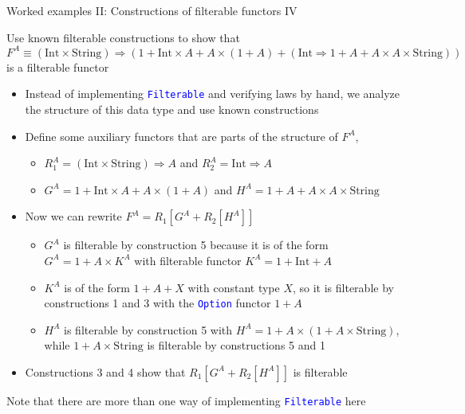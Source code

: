 \documentclass[english]{beamer}
\begin{document}
\begin{frame}{Worked examples II: Constructions of filterable functors IV}

Use known filterable constructions to show that{\footnotesize{} $F^{A}\equiv(\text{Int}\times\text{String})\Rightarrow\left(1+\text{Int}\times A+A\times\left(1+A\right)+\left(\text{Int}\Rightarrow1+A+A\times A\times\text{String}\right)\right)$
}is a filterable functor
\begin{itemize}
\item Instead of implementing \texttt{\textcolor{blue}{\footnotesize{}Filterable}}
and verifying laws by hand, we analyze the structure of this data
type and use known constructions
\item Define some auxiliary functors that are parts of the structure of
$F^{A}$,
\begin{itemize}
\item $R_{1}^{A}=\left(\text{Int}\times\text{String}\right)\Rightarrow A$
and $R_{2}^{A}=\text{Int}\Rightarrow A$ 
\item $G^{A}=1+\text{Int}\times A+A\times\left(1+A\right)$ and $H^{A}=1+A+A\times A\times\text{String}$
\end{itemize}
\item Now we can rewrite {\footnotesize{}$F^{A}=R_{1}\left[G^{A}+R_{2}\left[H^{A}\right]\right]$}{\footnotesize \par}
\begin{itemize}
\item $G^{A}$ is filterable by construction 5 because it is of the form
$G^{A}=1+A\times K^{A}$ with filterable functor $K^{A}=1+\text{Int}+A$
\item $K^{A}$ is of the form $1+A+X$ with constant type $X$, so it is
filterable by constructions 1 and 3 with the \texttt{\textcolor{blue}{\footnotesize{}Option}}
functor $1+A$
\item $H^{A}$ is filterable by construction 5 with $H^{A}=1+A\times\left(1+A\times\text{String}\right)$,
while $1+A\times\text{String}$ is filterable by constructions 5 and
1
\end{itemize}
\item Constructions 3 and 4 show that $R_{1}\left[G^{A}+R_{2}\left[H^{A}\right]\right]$
is filterable
\end{itemize}
Note that there are more than one way of implementing \texttt{\textcolor{blue}{\footnotesize{}Filterable}}
here
\end{frame}
\end{document}
